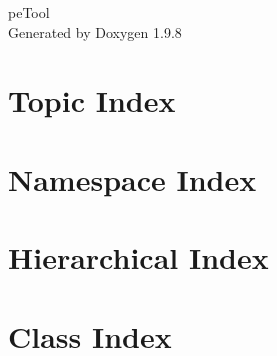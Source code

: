 \documentclass[twoside]{book}
\newcommand{\+}{\discretionary{\mbox{\scriptsize$\hookleftarrow$}}{}{}}
\newcommand{\clearemptydoublepage}{%
    \newpage{\pagestyle{empty}\cleardoublepage}%
  }
\begin{document}
  \raggedbottom
    \hypersetup{pageanchor=false,
                bookmarksnumbered=true,
                pdfencoding=unicode
               }
  \begin{titlepage}
  \vspace*{7cm}
  \begin{center}%
  {\Large pe\+Tool}\\
  \vspace*{1cm}
  {\large Generated by Doxygen 1.9.8}\\
  \end{center}
  \end{titlepage}
  \clearemptydoublepage
  \tableofcontents
  \clearemptydoublepage
  \hypersetup{pageanchor=true}















\chapter{Topic Index}

\chapter{Namespace Index}

\chapter{Hierarchical Index}

\chapter{Class Index}

\end{document}
